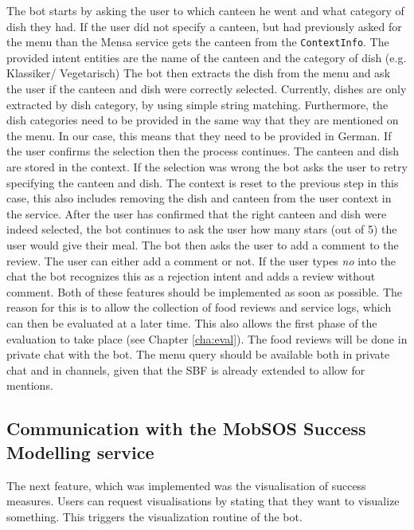The bot starts by asking the user to which canteen he went and what category of dish they had. If the user did not specify a canteen, but had previously asked for the menu than the Mensa service gets the canteen from the \texttt{ContextInfo}. 
The provided intent entities are the name of the canteen and the category of dish (e.g. Klassiker/ Vegetarisch) 
The bot then extracts the dish from the menu and ask the user if the canteen and dish were correctly selected. Currently, dishes are only extracted by dish category, by using simple string matching. Furthermore, the dish categories need to be provided in the same way that they are mentioned on the menu. In our case, this means that they need to be provided in German.
If the user confirms the selection then the process continues. The canteen and dish are stored in the context. If the selection was wrong the bot asks the user to retry specifying the canteen and dish. The context is reset to the previous step in this case, this also includes removing the dish and canteen from the user context in the service.
After the user has confirmed that the right canteen and dish were indeed selected, the bot continues to ask the user how many stars (out of 5) the user would give their meal. 
The bot then asks the user to add a comment to the review. The user can either add a comment or not. If the user types \emph{no} into the chat the bot recognizes this as a rejection intent and adds a review without comment.
Both of these features should be implemented as soon as possible. The reason for this is to allow the collection of food reviews and service logs, which can then be evaluated at a later time.
This also allows the first phase of the evaluation to take place (see Chapter \ref{cha:eval}).
The food reviews will be done in private chat with the bot. The menu query should be available both in private chat and in channels, given that the SBF is already extended to allow for mentions.

\subsection{Communication with the MobSOS Success Modelling service}

The next feature, which was implemented was the visualisation of success measures. Users can request visualisations by stating that they want to visualize something.
This triggers the visualization routine of the bot.

